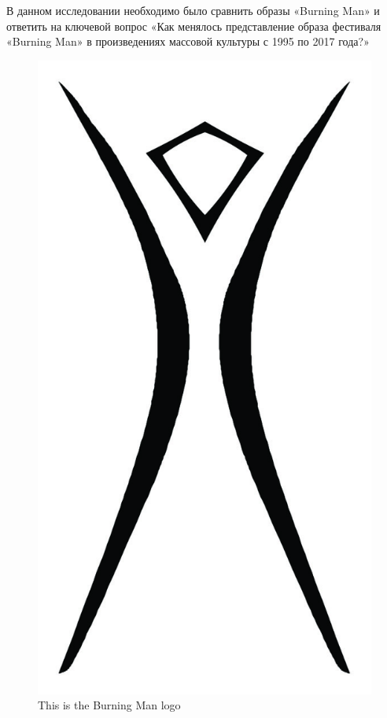 \documentclass[10pt,a4paper]{report}
\begin{document}
\begin{multicols}{2}
В данном исследовании необходимо было сравнить образы «Burning
Man» и ответить на ключевой вопрос «Как менялось представление
образа фестиваля «Burning Man» в произведениях массовой культуры
с 1995 по 2017 года?»

\begin{figure}
\includegraphics[width=\linewidth]{images/signbm.jpg}
\caption{This is the Burning Man logo}
\end{figure}


\end{multicols}
\end{document}
